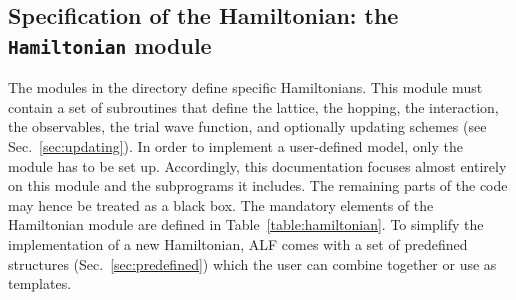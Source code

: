 \subsection{Specification of the Hamiltonian: the \texttt{Hamiltonian} module} 
\label{sec:hamiltonian}



The modules  in the directory   define  specific Hamiltonians. This module must contain a set of subroutines that define  the lattice,  the hopping,  the interaction, the observables,   the  trial wave function, and optionally  updating schemes (see Sec.~\ref{sec:updating}). 
In order to implement a user-defined model, only the module  has to be set up. Accordingly, this documentation focuses almost entirely  on this module and the subprograms it includes.
The remaining parts of the code may hence be treated as a black box.
The  mandatory  elements of the Hamiltonian module   are defined in Table~\ref{table:hamiltonian}.
To simplify  the implementation of a new Hamiltonian, ALF comes with a set of predefined structures (Sec.~\ref{sec:predefined}) which the user can combine together or use as templates.

